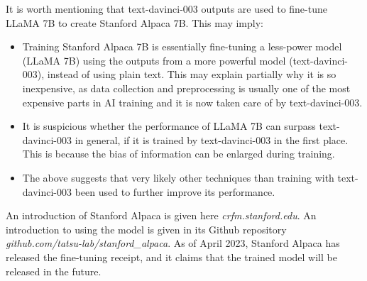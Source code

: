 It is worth mentioning that text-davinci-003 outputs are used to fine-tune LLaMA 7B to create Stanford Alpaca 7B. This may imply:
\begin{itemize}
	\item Training Stanford Alpaca 7B is essentially fine-tuning a less-power model (LLaMA 7B) using the outputs from a more powerful model (text-davinci-003), instead of using plain text. This may explain partially why it is so inexpensive, as data collection and preprocessing is usually one of the most expensive parts in AI training and it is now taken care of by text-davinci-003.
	\item It is suspicious whether the performance of LLaMA 7B can surpass text-davinci-003 in general, if it is trained by text-davinci-003 in the first place. This is because the bias of information can be enlarged during training.
	\item The above suggests that very likely other techniques than training with text-davinci-003 been used to further improve its performance.
\end{itemize}

An introduction of Stanford Alpaca is given here \textit{crfm.stanford.edu}. An introduction to using the model is given in its Github repository \textit{github.com/tatsu-lab/stanford\_alpaca}. As of April 2023, Stanford Alpaca has released the fine-tuning receipt, and it claims that the trained model will be released in the future.




















